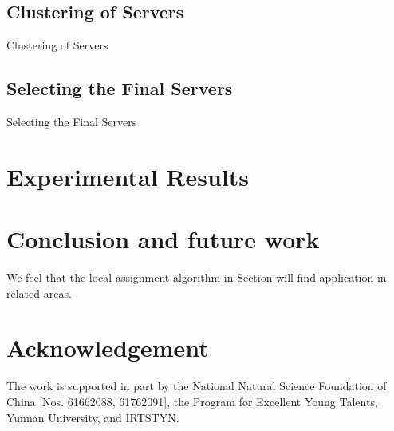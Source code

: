 \documentclass[11pt,a4paper]{article}
\begin{document}
\subsection{Clustering of Servers}
Clustering of Servers

\subsection{Selecting the Final Servers}
Selecting the Final Servers

\section{Experimental Results}

\section{Conclusion and future work}
We feel that the local assignment algorithm in Section will find
application in related areas.




\section*{Acknowledgement}
The work is
supported in part by the National Natural Science Foundation of
China [Nos. 61662088, 61762091], the Program
for Excellent Young Talents, Yunnan University, and IRTSTYN.

\begin{thebibliography}{}




\end{thebibliography}
\end{document}
